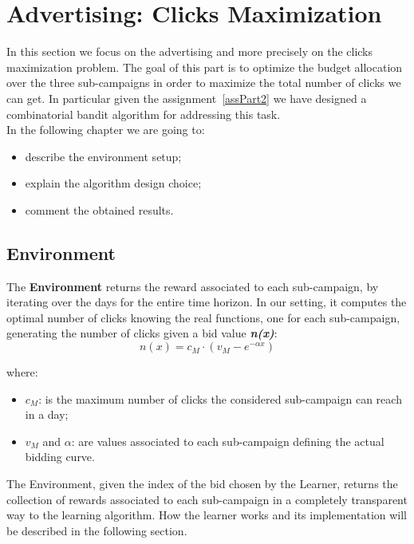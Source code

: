 \chapter{Advertising: Clicks Maximization}

In this section we focus on the advertising and more precisely on the clicks maximization problem.
The goal of this part is to optimize the budget allocation over the three sub-campaigns in order to maximize the total number of clicks we can get.
In particular given the assignment~\ref{assPart2} we have designed a combinatorial bandit algorithm for addressing this task.\\
In the following chapter we are going to:
\begin{itemize}
	\item describe the environment setup;
	\item explain the algorithm design choice;
	\item comment the obtained results.
\end{itemize}

\section{Environment}
The \textbf{Environment} returns the reward associated to each sub-campaign, by iterating over the days for the entire time horizon.
In our setting, it computes the optimal number of clicks knowing the real functions, one for each sub-campaign, generating  the number of clicks given a bid value \textbf{\textit{n(x)}}:\\

\begin{equation}
	n(x) = c_{M} \cdot (v_{M} - e^{-\alpha x})
\end{equation}

where:
\begin{itemize}
	\item $c_{M}$: is the maximum number of clicks the considered sub-campaign can reach in a day;
	\item $v_{M}$ and $\alpha$: are values associated to each sub-campaign defining the actual bidding curve.
\end{itemize}


The Environment, given the index of the bid chosen by the Learner, returns the collection of rewards associated to each sub-campaign in a completely transparent way to the learning algorithm.
How the learner works and its implementation will be described in the following section.



